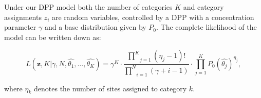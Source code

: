 Under our DPP model both the number of categories $K$ and category assignments $z_{i}$ are random variables, controlled by a DPP with a concentration parameter $\gamma$ and a base distribution given by $P_{0}$.
The complete likelihood of the model can be written down as:

\begin{equation}
L(\mathbf{z},K|\gamma,N,\hat{\theta_{1}},\ldots,\hat{\theta_{K}})=\gamma^{K}\cdot\frac{\underset{j=1}{\overset{K}{\prod}}\left(\eta_{j}-1\right)!}{\underset{i=1}{\overset{N}{\prod}}\left(\gamma+i-1\right)}\cdot\underset{j=1}{\overset{K}{\prod}}P_{0}\left(\hat{\theta_{j}}\right)^{\eta_{j}},
\label{eq:dppLike} 
\end{equation} 

\noindent 
where $\eta_{k}$ denotes the number of sites assigned to category $k$.







